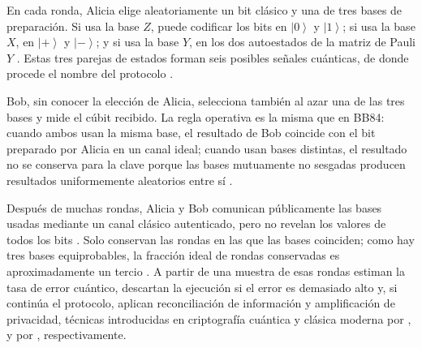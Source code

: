 En cada ronda, Alicia elige aleatoriamente un bit clásico y una de tres bases de preparación. Si usa la base $Z$, puede codificar los bits en $\left|0\right\rangle$ y $\left|1\right\rangle$; si usa la base $X$, en $\left|+\right\rangle$ y $\left|-\right\rangle$; y si usa la base $Y$, en los dos autoestados de la matriz de Pauli $Y$ \citep{pauli1927,bruss1998}. Estas tres parejas de estados forman seis posibles señales cuánticas, de donde procede el nombre del protocolo \citep{bruss1998}.

Bob, sin conocer la elección de Alicia, selecciona también al azar una de las tres bases y mide el cúbit recibido. La regla operativa es la misma que en BB84: cuando ambos usan la misma base, el resultado de Bob coincide con el bit preparado por Alicia en un canal ideal; cuando usan bases distintas, el resultado no se conserva para la clave porque las bases mutuamente no sesgadas producen resultados uniformemente aleatorios entre sí \citep{schwinger1960,bennett1984}.

Después de muchas rondas, Alicia y Bob comunican públicamente las bases usadas mediante un canal clásico autenticado, pero no revelan los valores de todos los bits \citep{bennett1984}. Solo conservan las rondas en las que las bases coinciden; como hay tres bases equiprobables, la fracción ideal de rondas conservadas es aproximadamente un tercio \citep{bruss1998}. A partir de una muestra de esas rondas estiman la tasa de error cuántico, descartan la ejecución si el error es demasiado alto y, si continúa el protocolo, aplican reconciliación de información y amplificación de privacidad, técnicas introducidas en criptografía cuántica y clásica moderna por \cite{brassard1994}, y por \cite{bennett1995}, respectivamente.

